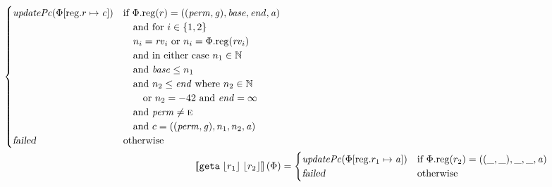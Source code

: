 \documentclass[a4paper]{article}
\newcommand{\update}[2]{[#1 \mapsto #2]}
\newcommand{\sem}[1]{\left\llbracket #1 \right\rrbracket}
\newcommand{\var}[1]{\mathit{#1}}
\newcommand{\rv}{\var{rv}}
\newcommand{\gl}{\var{g}}
\newcommand{\addr}{\var{a}}
\newcommand{\start}{\var{base}}
\newcommand{\addrend}{\var{end}}
\newcommand{\inftyend}{-42}
\newcommand{\perm}{\var{perm}}
\newcommand{\stdcap}[1][(\perm,\gl)]{\left(#1,\start,\addrend,\addr \right)}
\newcommand{\plainproj}[1]{\mathrm{#1}}
\newcommand{\memreg}[1][\Phi]{#1.\plainproj{reg}}
\newcommand{\updateReg}[3][\Phi]{#1\update{\plainproj{reg}.#2}{#3}}
\newcommand{\failed}{\textsl{failed}}
\newcommand{\plainfun}[2]{
  \ifthenelse{\equal{#2}{}}
  {\mathit{#1}}
  {\mathit{#1}(#2)}
}
\newcommand{\stdUpdatePc}[1]{\plainfun{updatePc}{#1}}
\newcommand{\nats}{\mathbb{N}}
\newcommand{\refreg}[1]{\lfloor #1 \rfloor}
\newcommand{\zinstr}[1]{\mathtt{#1}}
\newcommand{\twoinstr}[3]{\zinstr{#1} \; #2 \; #3}
\newcommand{\geta}[2]{\twoinstr{geta}{#1}{#2}}
\newcommand{\plainperm}[1]{\textsc{#1}}
\newcommand{\entry}{\plainperm{e}}
\begin{document}
\begin{align*}
\begin{cases}
                                              \stdUpdatePc{\updateReg{r}{\var{c}}} &
                                              \arraycolsep=0pt
                                              \begin{array}[t]{l}
                                                \text{if $\memreg(r) = \stdcap$} \\
                                                \quad\text{and for $i \in \{1,2\}$}\\
                                                \quad\text{$n_i = \rv_i$ or $n_i = \memreg(\rv_i)$}\\
                                                \quad\text{and in either case $n_1 \in \nats$}\\
                                                \quad\text{and $\start \leq n_1$}\\
                                                \quad\text{and $n_2 \leq \addrend$ where $n_2 \in \nats$}\\
                                                \quad\quad\text{or $n_2=\inftyend$ and $\addrend = \infty$}\\
                                                \quad\text{and $\perm \neq \entry$}\\
                                                \quad\text{and $c = ((\perm,\gl),n_1,n_2,\addr)$}
                                              \end{array} \\
                                              \failed & \text{otherwise}
                                            \end{cases}
  \\
  \sem{\geta{\refreg{r_1}}{\refreg{r_2}}}(\Phi) & = 
                                            \begin{cases}
                                              \stdUpdatePc{\updateReg{r_1}{\addr}} &
                                              \arraycolsep=0pt
                                              \begin{array}[t]{l}
                                                \text{if $\memreg(r_2) = ((\_,\_),\_,\_,\addr)$}
                                              \end{array} \\
                                              \failed & \text{otherwise}
                                            \end{cases}
  \\

\end{align*}
\end{document}
